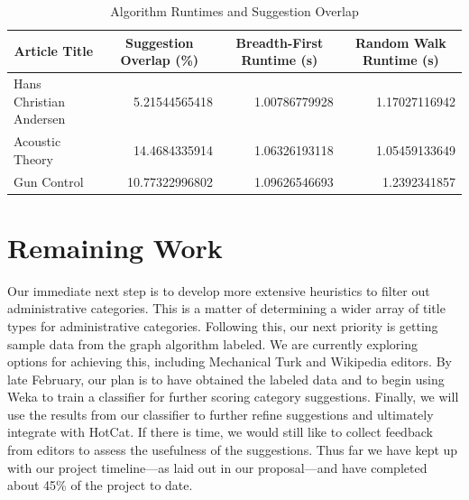 \documentclass[]{sig-alternate}
\begin{document}
\begin{table}[htb!]
\centering
\begin{tabular}{|l|r|r|r|}
	\hline
	\multicolumn{1}{|c}{Article Title} & \multicolumn{1}{|c}{Suggestion Overlap (\%)} & \multicolumn{1}{|c}{Breadth-First Runtime (s)} & \multicolumn{1}{|c|}{Random Walk Runtime (s)} \\ \hline \hline
	Hans Christian Andersen & 5.21544565418 & 1.00786779928 & 1.17027116942\\ \hline
	Acoustic Theory & 14.4684335914 & 1.06326193118 & 1.05459133649\\ \hline
	Gun Control & 10.77322996802 & 1.09626546693 & 1.2392341857\\ \hline
\end{tabular}
\caption{Algorithm Runtimes and Suggestion Overlap}
\label{fig:runtime_table}
\end{table}

\section{Remaining Work}
\label{sec:remaining_work}

Our immediate next step is to develop more extensive heuristics to filter out administrative categories. This is a matter of determining a wider array of title types for administrative categories. Following this, our next priority is getting sample data from the graph algorithm labeled. We are currently exploring options for achieving this, including Mechanical Turk and Wikipedia editors. By late February, our plan is to have obtained the labeled data and to begin using Weka to train a classifier for further scoring category suggestions. Finally, we will use the results from our classifier to further refine suggestions and ultimately integrate with HotCat. If there is time, we would still like to collect feedback from editors to assess the usefulness of the suggestions. Thus far we have kept up with our project timeline---as laid out in our proposal---and have completed about 45\% of the project to date.



\nocite{*}
\end{document}
